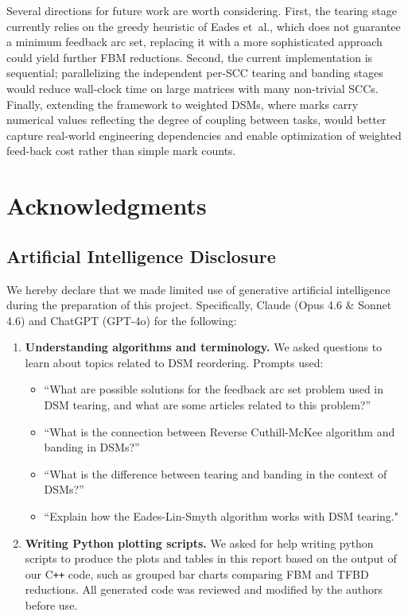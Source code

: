 \documentclass[12pt]{article}
\theoremstyle{definition}
\begin{document}
Several directions for future work are worth considering. First, the tearing stage currently relies on the greedy heuristic of Eades et~al., which does not guarantee a minimum feedback arc set, replacing it with a more sophisticated approach could yield further FBM reductions. Second, the current implementation is sequential; parallelizing the independent per-SCC tearing and banding stages would reduce wall-clock time on large matrices with many non-trivial SCCs. Finally, extending the framework to weighted DSMs, where marks carry numerical values reflecting the degree of coupling between tasks, would better capture real-world engineering dependencies and enable optimization of weighted feed-back cost rather than simple mark counts. 

\section{Acknowledgments}\label{sec:acknowledgements}

\subsection{Artificial Intelligence Disclosure}

We hereby declare that we made limited use of generative artificial intelligence during the preparation of this project. Specifically, Claude (Opus 4.6 \& Sonnet 4.6) and ChatGPT (GPT-4o) for the following:

\begin{enumerate}
    \item \textbf{Understanding algorithms and terminology.} We asked questions to learn about topics related to DSM reordering. Prompts used:
    \begin{itemize}
        \item ``What are possible solutions for the feedback arc set problem used in DSM tearing, and what are some articles related to this problem?''
        \item ``What is the connection between Reverse Cuthill-McKee algorithm and banding in DSMs?''
        \item ``What is the difference between tearing and banding in the context of DSMs?''
	\item ``Explain how the Eades-Lin-Smyth algorithm works with DSM tearing."
    \end{itemize}
\item \textbf{Writing Python plotting scripts.} We asked for help writing python scripts to produce the plots and tables in this report based on the output of our C\texttt{++} code, such as grouped bar charts comparing FBM and TFBD reductions. All generated code was reviewed and modified by the authors before use. 
\end{enumerate}
\end{document}
